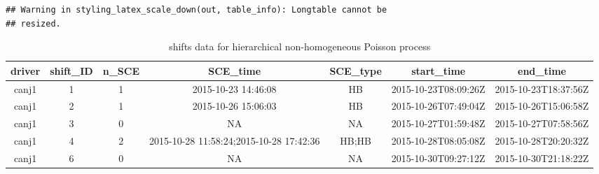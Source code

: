 \documentclass[12pt]{book}
\numberwithin{equation}{chapter}
\begin{document}
\begin{table}[H]

\caption{\label{tab:analysis30int}30 minutes intervals data for hierarchical logistic and Poisson regression}
\centering
{}
\end{table}

\begin{verbatim}
## Warning in styling_latex_scale_down(out, table_info): Longtable cannot be
## resized.
\end{verbatim}

\begin{longtable}{ccccccc}
\caption{\label{tab:analysisshift}shifts data for hierarchical non-homogeneous Poisson process}\\
\toprule
driver & shift\_ID & n\_SCE & SCE\_time & SCE\_type & start\_time & end\_time\\
\midrule
canj1 & 1 & 1 & 2015-10-23 14:46:08 & HB & 2015-10-23T08:09:26Z & 2015-10-23T18:37:56Z\\
canj1 & 2 & 1 & 2015-10-26 15:06:03 & HB & 2015-10-26T07:49:04Z & 2015-10-26T15:06:58Z\\
canj1 & 3 & 0 & NA & NA & 2015-10-27T01:59:48Z & 2015-10-27T07:58:56Z\\
canj1 & 4 & 2 & 2015-10-28 11:58:24;2015-10-28 17:42:36 & HB;HB & 2015-10-28T08:05:08Z & 2015-10-28T20:20:32Z\\
canj1 & 6 & 0 & NA & NA & 2015-10-30T09:27:12Z & 2015-10-30T21:18:22Z\\
\bottomrule
\end{longtable}
\end{document}
